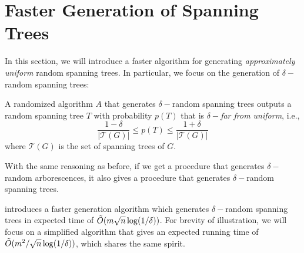\section{Faster Generation of Spanning Trees}

In this section, we will introduce a faster algorithm for generating \emph{approximately uniform} random spanning trees. In particular, we focus on the generation of $\delta-$random spanning trees:

\begin{definition}
A randomized algorithm $A$ that generates $\delta-$random spanning trees outputs a random spanning tree $T$ with probability $p(T)$ that is \emph{$\delta-$far from uniform}, i.e., 
$$\frac{1-\delta}{|\mathcal{T}(G)|}\leq p(T) \leq \frac{1+\delta}{|\mathcal{T}(G)|}$$
where $\mathcal{T}(G)$ is the set of spanning trees of $G$.
\end{definition}



With the same reasoning as before, if we get a procedure that generates $\delta-$random arborescences, it also gives a procedure that generates $\delta-$random spanning trees. 

\cite{kelner2009faster} introduces a faster generation algorithm which generates $\delta-$random spanning trees in expected time of $\tilde{O}(m\sqrt{n}\log(1/\delta))$. For brevity of illustration, we will focus on a simplified algorithm that gives an expected running time of $\tilde{O}(m^2/\sqrt{n}\log(1/\delta))$, which shares the same spirit.



